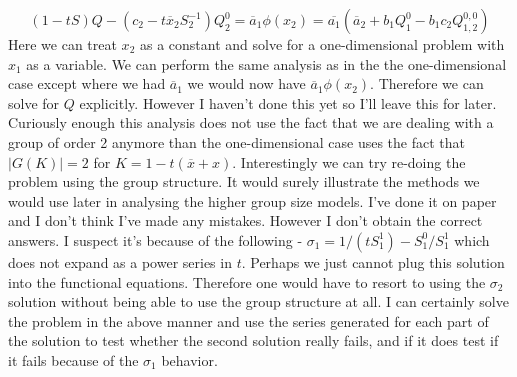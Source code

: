 \documentclass[12pt]{article}
\theoremstyle{definition} \newtheorem{definition}[theorem]{Definition}
\newcommand{\ol}[1]{\overline{#1}}
\begin{document}
\[
	(1-tS)Q - (c_2 -t\ol{x}_2 S_2^{-1})Q_2^0  = \ol{a}_1\phi(x_2) = \ol{a_1}(\ol{a}_2 + b_1 Q_1^0 -b_1c_2Q_{1,2}^{0,0})
\]
Here we can treat $x_2$ as a constant and solve for a one-dimensional problem with $x_1$ as a variable. We can perform the same analysis as in the the one-dimensional case except where we had $\ol{a}_1$ we would now have $\ol{a}_1 \phi(x_2)$. Therefore we can solve for $Q$ explicitly. However I haven't done this yet so I'll leave this for later. Curiously enough this analysis does not use the fact that we are dealing with a group of order 2 anymore than the one-dimensional case uses the fact that $|G(K)| = 2$ for $K = 1 - t(\ol{x}+x)$. Interestingly we can try re-doing the problem using the group structure. It would surely illustrate the methods we would use later in analysing the higher group size models. I've done it on paper and I don't think I've made any mistakes. However I don't obtain the correct answers. I suspect it's because of the following - $\sigma_1 = 1/(tS_1^1) - S_1^0/S_1^1$ which does not expand as a power series in $t$. Perhaps we just cannot plug this solution into the functional equations. Therefore one would have to resort to using the $\sigma_2$ solution without being able to use the group structure at all. I can certainly solve the problem in the above manner and use the series generated for each part of the solution to test whether the second solution really fails, and if it does test if it fails because of the $\sigma_1$ behavior.
\end{document}
